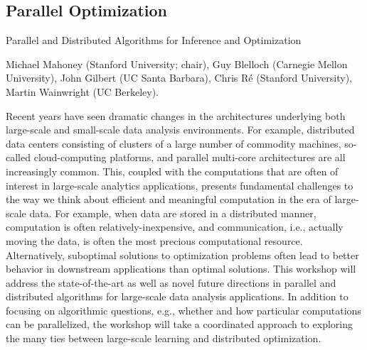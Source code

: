 \subsection{Parallel Optimization}
Parallel and Distributed Algorithms for Inference and Optimization

Michael Mahoney (Stanford University; chair), Guy Blelloch (Carnegie Mellon University), John Gilbert (UC Santa Barbara), Chris Ré (Stanford University), Martin Wainwright (UC Berkeley).

Recent years have seen dramatic changes in the architectures underlying both large-scale and small-scale data analysis environments. For example, distributed data centers consisting of clusters of a large number of commodity machines, so-called cloud-computing platforms, and parallel multi-core architectures are all increasingly common. This, coupled with the computations that are often of interest in large-scale analytics applications, presents fundamental challenges to the way we think about efficient and meaningful computation in the era of large-scale data. For example, when data are stored in a distributed manner, computation is often relatively-inexpensive, and communication, i.e., actually moving the data, is often the most precious computational resource. Alternatively, suboptimal solutions to optimization problems often lead to better behavior in downstream applications than optimal solutions. This workshop will address the state-of-the-art as well as novel future directions in parallel and distributed algorithms for large-scale data analysis applications. In addition to focusing on algorithmic questions, e.g., whether and how particular computations can be parallelized, the workshop will take a coordinated approach to exploring the many ties between large-scale learning and distributed optimization.


